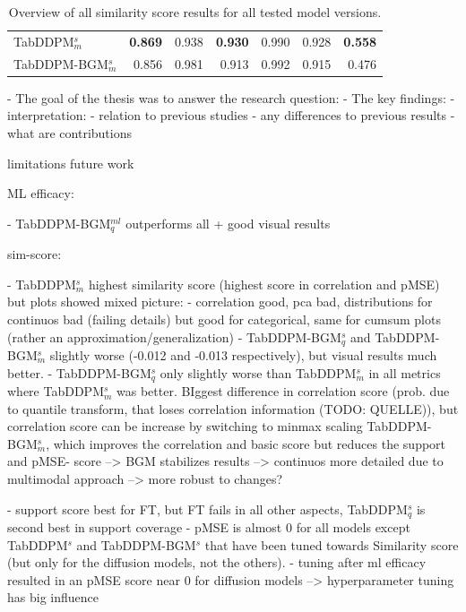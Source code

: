 \begin{table}[h]
\begin{tabular}{lrrrrrr}
		TabDDPM$^{s}_m$      & \textbf{0.869}            & 0.938          & \textbf{0.930}       & 0.990          & 0.928            & \textbf{0.558} \\
		TabDDPM-BGM$^{s}_m$  & 0.856                     & 0.981          & 0.913                & 0.992          & 0.915            & 0.476          \\
		\bottomrule
	\end{tabular}
	\caption[]{Overview of all similarity score results for all tested model versions.}
	\label{tab:sim-all}
\end{table}

- The goal of the thesis was to answer the research question:
- The key findings:
- interpretation:
	- relation to previous studies
	- any differences to previous results
	- what are contributions

limitations
future work




ML efficacy:

- TabDDPM-BGM$^{ml}_q$ outperforms all + good visual results

sim-score:

- TabDDPM$^{s}_m$ highest similarity score (highest score in correlation and pMSE) but plots showed mixed picture: 
	- correlation good, pca bad, distributions for continuos bad (failing details) but good for categorical, same for cumsum plots (rather an approximation/generalization)
- TabDDPM-BGM$^{s}_q$ and TabDDPM-BGM$^{s}_m$ slightly worse (-0.012 and -0.013 respectively), but visual results much better.
- TabDDPM-BGM$^{s}_q$ only slightly worse than TabDDPM$^{s}_m$ in all metrics where TabDDPM$^{s}_m$ was better. BIggest difference in correlation score (prob. due to quantile transform, that loses correlation information (TODO: QUELLE)),
but correlation score can be increase by switching to minmax scaling TabDDPM-BGM$^{s}_m$, which improves the correlation and basic score but reduces the support and pMSE- score
--> BGM stabilizes results --> continuos more detailed due to multimodal approach --> more robust to changes?

- support score best for FT, but FT fails in all other aspects, TabDDPM$^{s}_q$ is second best in support coverage 
- pMSE is almost 0 for all models except TabDDPM$^{s}$  and TabDDPM-BGM$^{s}$  that have been tuned towards Similarity score (but only for the diffusion models, not the others).
	- tuning after ml efficacy resulted in an pMSE score near 0 for diffusion models --> hyperparameter tuning has big influence


